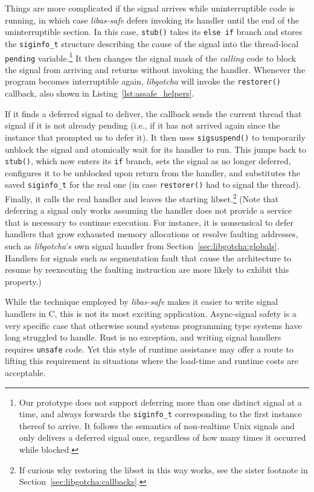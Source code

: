 Things are more complicated if the signal arrives while uninterruptible code is
running, in which case \textit{libas-safe} defers invoking its handler until the end
of the uninterruptible section.  In this case, \texttt{stub()} takes its
\texttt{else if} branch and stores the \texttt{siginfo\_t} structure describing the
cause of the signal into the thread-local \texttt{pending} variable.\footnote{Our
prototype does not support deferring more than one distinct signal at a time, and
always forwards the \texttt{siginfo\_t} corresponding to the first instance thereof
to arrive.  It follows the semantics of non-realtime Unix signals and only delivers
a deferred signal once, regardless of how many times it occurred while blocked.}  It
then changes the signal mask of the \textit{calling} code to block the signal from
arriving and returns without invoking the handler.  Whenever the program becomes
interruptible again, \textit{libgotcha} will invoke the \texttt{restorer()} callback,
also shown in Listing~\ref{lst:assafe_helpers}.

If it finds a deferred signal to deliver, the callback sends the current thread that
signal if it is not already pending (i.e., if it has not arrived again since the
instance that prompted us to defer it).  It then uses \texttt{sigsuspend()} to
temporarily unblock the signal and atomically wait for its handler to run.  This
jumps back to \texttt{stub()}, which now enters its \texttt{if} branch, sets the
signal as no longer deferred, configures it to be unblocked upon return from the
handler, and substitutes the saved \texttt{siginfo\_t} for the real one (in case
\texttt{restorer()} had to signal the thread).  Finally, it calls the real
handler and leaves the starting libset.\footnote{If curious why restoring the libset
in this way works, see the sister footnote in Section~\ref{sec:libgotcha:callbacks}.}
(Note that deferring a signal only works assuming the handler does not provide a
service that is necessary to continue execution.  For instance, it is nonsensical to
defer handlers that grow exhausted memory allocations or resolve faulting addresses,
such as \textit{libgotcha}'s own signal handler from
Section~\ref{sec:libgotcha:globals}.  Handlers for signals such as segmentation fault
that cause the architecture to resume by reexecuting the faulting instruction are
more likely to exhibit this property.)

While the technique employed by \textit{libas-safe} makes it easier to write signal
handlers in C, this is not its most exciting application.  Async-signal safety is a
very specific case that otherwise sound systems programming type systems have long
struggled to handle.  Rust is no exception, and writing signal handlers requires
\texttt{unsafe} code.  Yet this style of runtime assistance may offer a route to
lifting this requirement in situations where the load-time and runtime costs are
acceptable.


